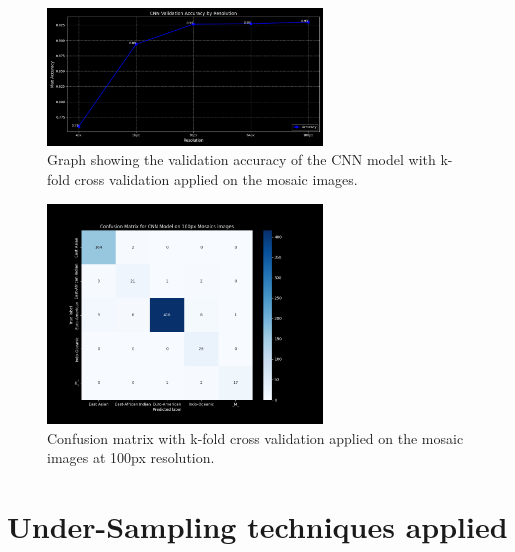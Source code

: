 \begin{appendices}
	\begin{figure}[H]
		\centering
		\includegraphics[width=0.65\textwidth]{../imgs/graphs/kfold/cnn_validation_accuracy_kfold_mosaics_line_mask_5_std.png}
		\caption{Graph showing the validation accuracy of the CNN model with k-fold cross validation applied on the mosaic images.}
		\label{fig:kfold_accuracy_mosaic}
	\end{figure}

	\begin{figure}[H]
		\centering
		\includegraphics[width=0.65\textwidth]{../imgs/graphs/kfold/cnn_confusion_matrix_kfold_mosaics_100px_mask_5_std.png}
		\caption{Confusion matrix with k-fold cross validation applied on the mosaic images at 100px resolution.}
		\label{fig:kfold_confusion_matrix_mosaic}
	\end{figure}

	\section{Under-Sampling techniques applied}
	\label{app:under_sampling}


\end{appendices}
